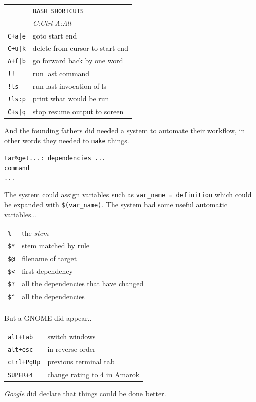 \documentclass[a4paper,12pt]{article}
\begin{document}
\begin{multicols}{2}
\vfill
\begin{tabular}{ll}
&\texttt{BASH SHORTCUTS}\\
&\emph{C:Ctrl A:Alt}\\
\texttt{C+a|e}&goto start \textbar{} end\\
\texttt{C+u|k}&delete from cursor to start \textbar{} end\\
\texttt{A+f|b}&go forward \textbar{} back by one word\\
\texttt{!!}&run last command\\
\texttt{!ls}&run last invocation of ls\\
\texttt{!ls:p}&print what would be run\\
\texttt{C+s|q}&stop \textbar{} resume output to screen\\
\end{tabular}
\vfill
And the founding fathers did needed a system to automate their workflow, in
other words they needed to \texttt{make} things.
\bigskip 
\begin{tabbing}
\texttt{tar\%get...}\= \texttt{: dependencies ...}\\
\>\texttt{command}\\
\>\texttt{...}\\
\end{tabbing}
\bigskip
The system could assign variables such as \texttt{var\_name = definition} which
could be expanded with \texttt{\$(var\_name)}.
\bigskip
The system had some useful automatic variables...
\bigskip
\begin{tabular}{ll}
\texttt{\%}&the \emph{stem}\\
\texttt{\$*}&stem matched by rule\\
\texttt{\$@}&filename of target\\
\texttt{\$<}&first dependency\\
\texttt{\$?}&all the dependencies that have changed\\
\texttt{\$\^}&all the dependencies\\
\texttt{}&\\
\end{tabular}
\vfill
But a GNOME did appear..

\begin{tabular}{ll}
\texttt{alt+tab}&switch windows\\
\texttt{alt+esc}&in reverse order\\
\texttt{ctrl+PgUp}&previous terminal tab\\
\texttt{SUPER+4}&change rating to 4 in Amarok\\
\end{tabular}
\vfill
\columnbreak
\emph{Google} did declare that things could be done better.


\end{multicols}
\end{document}
